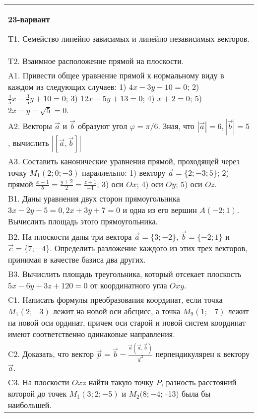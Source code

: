 \documentclass{article}
\begin{document}
\begin{tabular}{m{17cm}}
\textbf{23-вариант}
\newline

T1. 
Семейство линейно зависимых и линейно независимых векторов.
 \\
T2. 
Взаимное расположение прямой на плоскости.
 \\
A1. 
Привести общее уравнение прямой к нормальному виду в каждом из следующих случаев: 1) \(4x - 3y - 10 = 0\); 2) \(\frac{4}{5}x - \frac{3}{5}y + 10 = 0\); 3) \(12x - 5y + 13 = 0\); 4) \(x + 2 = 0\); 5) \(2x - y - \sqrt{5} = 0\).
 \\
A2. 
Векторы \(\overrightarrow{a}\) и \(\overrightarrow{b}\) образуют угол \(\varphi = \pi/6\). Зная, что \(|\overrightarrow{a}| = 6,|\overrightarrow{b}| = 5\), вычислить \(\left| \left\lbrack \overrightarrow{a},\overrightarrow{b} \right\rbrack \right|\)
 \\
A3. 
Составить канонические уравнения прямой, проходящей через точку \(M_{1}(2;0; - 3)\) параллельно: 1) вектору \(\overrightarrow{a} = \{ 2; - 3;5\}\); 2) прямой \(\frac{x - 1}{5} = \frac{y + 2}{2} = \frac{z + 1}{- 1}\); 3) оси \(Ox\); 4) оси \(Oy\); 5) оси \(Oz\).
 \\
B1. 
Даны уравнения двух сторон прямоугольника \(3x - 2y - 5 = 0,2x + 3y + 7 = 0\) и одна из его вершин \(A( - 2;1)\). Вычислить площадь этого прямоугольника.
 \\
B2. На плоскости даны три вектора \(\overrightarrow{a} = \{ 3; - 2\}\), \(\overrightarrow{b} = \{ - 2;1\}\) и \(\overrightarrow{c} = \{ 7; - 4\}\). Определить разложение каждого из этих трех векторов, принимая в качестве базиса два других.
 \\
B3. 
Вычислить площадь треугольника, который отсекает плоскость \(5x - 6y + 3z + 120 = 0\) от координатного угла \(Oxy\).
 \\
C1. 
Написать формулы преобразования координат, если точка \(M_{1}(2; - 3)\) лежит на новой оси абсцисс, а точка \(M_{2}(1; - 7)\) лежит на новой оси ординат, причем оси старой и новой систем координат имеют соответственно одинаковые направления.
 \\
C2. 
Доказать, что вектор \(\overrightarrow{p} = \overrightarrow{b} - \frac{\overrightarrow{a}(\overrightarrow{a},\overrightarrow{b})}{{\overrightarrow{a}}^{2}}\) перпендикулярен к вектору \(\overrightarrow{a}\).
 \\
C3. 
На плоскости \(Oxz\) найти такую точку \(P\), разность расстояний которой до точек \(M_{1}(3;2; - 5)\) и \(M_{2}(8; - 4\); -13) была бы наибольшей.
 \\

\end{tabular}
\vspace{1cm}
\end{document}
